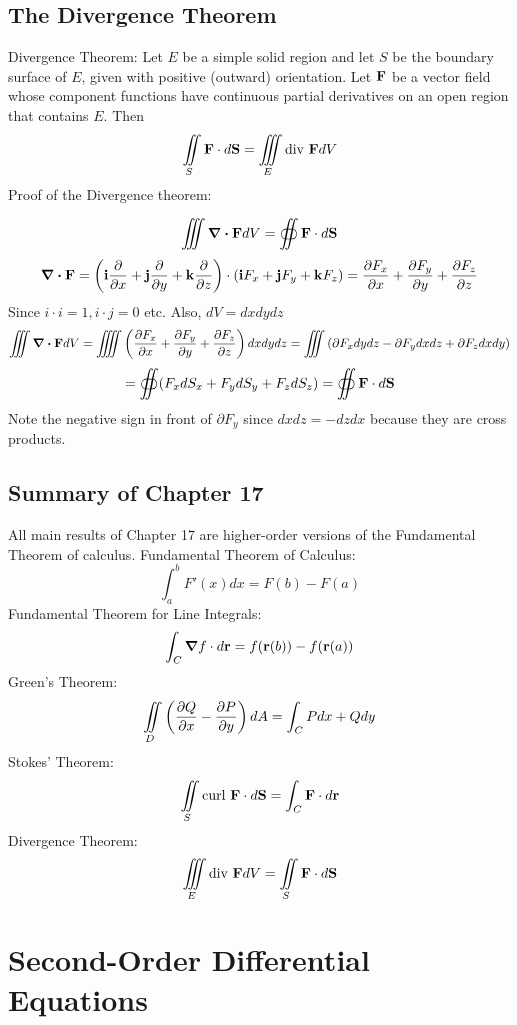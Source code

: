 \documentclass{article}
\begin{document}
    \subsection{The Divergence Theorem}
    \begin{outline}
        \1 Divergence Theorem: Let $E$ be a simple solid region and let $S$ be the boundary surface of $E$, given with positive (outward) orientation. Let \(\vb F\) be a vector field whose component functions have continuous partial derivatives on an open region that contains $E$. Then \[\iint\limits_S\vb F\cdot d\vb S=\iiint\limits_E\text{div }\vb FdV\]
        \1 Proof of the Divergence theorem: 
    \end{outline}
    \[\iiint\div\vb FdV=\oiint\vb F\cdot d\vb S\]
    \[\div\vb F=\left(\vb i\pdv{x}+\vb j\pdv{y}+\vb k\pdv{z}\right)\cdot\left(\vb iF_x+\vb jF_y+\vb kF_z\right)=\pdv{F_x}{x}+\pdv{F_y}{y}+\pdv{F_z}{z}\]
    Since \(i\cdot i=1,i\cdot j=0\) etc. Also, \(dV=dxdydz\)
    \[\iiint\div\vb FdV=\iiiint\left(\pdv{F_x}{x}+\pdv{F_y}{y}+\pdv{F_z}{z}\right)dxdydz=\iiint\left(\partial F_xdydz-\partial F_ydxdz+\partial F_zdxdy\right)\]
    \[=\oiint(F_xdS_x+F_ydS_y+F_zdS_z)=\oiint\vb F\cdot d\vb S\]
    Note the negative sign in front of \(\partial F_y\) since \(dxdz=-dzdx\) because they are cross products. 
    \subsection{Summary of Chapter 17}
    \begin{outline}
        \1 All main results of Chapter 17 are higher-order versions of the Fundamental Theorem of calculus. 
        \1 Fundamental Theorem of Calculus: \[\int^b_aF'(x)dx=F(b)-F(a)\]
        \1 Fundamental Theorem for Line Integrals: \[\int_C\grad f\cdot d\vb r=f(\vb r(b)) - f(\vb r(a))\]
        \1 Green's Theorem: \[\iint\limits_D\left(\pdv{Q}{x}-\pdv{P}{y}\right)dA=\int_CPdx+Qdy\]
        \1 Stokes' Theorem: \[\iint\limits_S\text{curl }\vb F\cdot d\vb S=\int_C\vb F\cdot d\vb r\]
        \1 Divergence Theorem: \[\iiint\limits_E\text{div }\vb FdV=\iint\limits_S\vb F\cdot d\vb S\]
    \end{outline}

    \section{Second-Order Differential Equations} %
    
\end{document}
